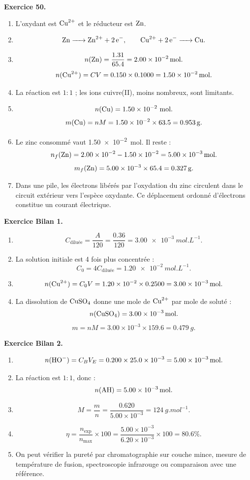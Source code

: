 \documentclass[11pt,a4paper]{article}
\newcommand{\corr}[2]{
  \begin{correctionbox}
  \textbf{Exercice #1.} #2
  \end{correctionbox}
}
\begin{document}
\corr{50}{
\begin{enumerate}
  \item L'oxydant est $\ce{Cu^{2+}}$ et le réducteur est $\ce{Zn}$.
  \item
  \[
  \ce{Zn -> Zn^{2+} + 2e-},
  \qquad
  \ce{Cu^{2+} + 2e- -> Cu}.
  \]
  \item
  \[
  n(\ce{Zn})=\frac{1.31}{65.4}=\SI{2.00e-2}{mol}.
  \]
  \[
  n(\ce{Cu^{2+}})=CV=0.150\times 0.1000=\SI{1.50e-2}{mol}.
  \]
  \item La réaction est $1:1$ ; les ions cuivre(II), moins nombreux, sont limitants.
  \item
  \[
  n(\ce{Cu})=1.50\times 10^{-2}\ \text{mol}.
  \]
  \[
  m(\ce{Cu})=nM=1.50\times 10^{-2}\times 63.5=\SI{0.953}{g}.
  \]
  \item Le zinc consommé vaut \SI{1.50e-2}{mol}. Il reste :
  \[
  n_f(\ce{Zn})=2.00\times 10^{-2}-1.50\times 10^{-2}
  =\SI{5.00e-3}{mol}.
  \]
  \[
  m_f(\ce{Zn})=5.00\times 10^{-3}\times 65.4=\SI{0.327}{g}.
  \]
  \item Dans une pile, les électrons libérés par l'oxydation du zinc circulent dans le circuit extérieur vers l'espèce oxydante. Ce déplacement ordonné d'électrons constitue un courant électrique.
\end{enumerate}
}

\corr{Bilan 1}{
\begin{enumerate}
  \item
  \[
  C_{\text{diluée}}=\frac{A}{120}=\frac{0.36}{120}=\SI{3.00e-3}{mol.L^{-1}}.
  \]
  \item La solution initiale est 4 fois plus concentrée :
  \[
  C_0=4C_{\text{diluée}}=\SI{1.20e-2}{mol.L^{-1}}.
  \]
  \item
  \[
  n(\ce{Cu^{2+}})=C_0V=1.20\times 10^{-2}\times 0.2500
  =\SI{3.00e-3}{mol}.
  \]
  \item La dissolution de $\ce{CuSO4}$ donne une mole de $\ce{Cu^{2+}}$ par mole de soluté :
  \[
  n(\ce{CuSO4})=\SI{3.00e-3}{mol}.
  \]
  \[
  m=nM=3.00\times 10^{-3}\times 159.6=\SI{0.479}{g}.
  \]
\end{enumerate}
}

\corr{Bilan 2}{
\begin{enumerate}
  \item
  \[
  n(\ce{HO-})=C_BV_E=0.200\times 25.0\times 10^{-3}
  =\SI{5.00e-3}{mol}.
  \]
  \item La réaction est $1:1$, donc :
  \[
  n(\ce{AH})=\SI{5.00e-3}{mol}.
  \]
  \item
  \[
  M=\frac{m}{n}=\frac{0.620}{5.00\times 10^{-3}}
  =\SI{124}{g.mol^{-1}}.
  \]
  \item
  \[
  \eta=\frac{n_{\text{exp}}}{n_{\max}}\times 100
  =\frac{5.00\times 10^{-3}}{6.20\times 10^{-3}}\times 100
  =80.6\%.
  \]
  \item On peut vérifier la pureté par chromatographie sur couche mince, mesure de température de fusion, spectroscopie infrarouge ou comparaison avec une référence.
\end{enumerate}
}
\end{document}
